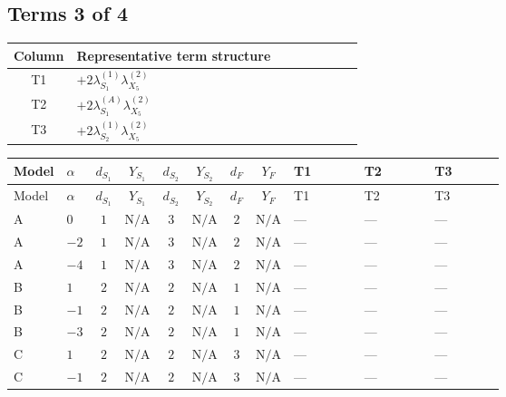 \documentclass[8pt]{article}
\begin{document}
\begin{landscape}
\subsection*{Terms 3 of 4}
\begin{center}
\begin{tabular}{@{}c >{\raggedright\arraybackslash}p{0.82\linewidth}@{}}
\toprule
Column & Representative term structure \\
\midrule
T1 & \(\displaystyle +2 {\lambda_{S_1}^{(1)}} {\lambda_{X_{5}}^{(2)}}\) \\
\midrule
T2 & \(\displaystyle +2 {\lambda_{S_1}^{(A)}} {\lambda_{X_{5}}^{(2)}}\) \\
\midrule
T3 & \(\displaystyle +2 {\lambda_{S_2}^{(1)}} {\lambda_{X_{5}}^{(2)}}\) \\
\midrule
\bottomrule
\end{tabular}
\end{center}
\smallskip
\tiny
\begin{longtable}{@{}llcccccc >{\raggedright\arraybackslash}p{0.21\linewidth} >{\raggedright\arraybackslash}p{0.21\linewidth} >{\raggedright\arraybackslash}p{0.21\linewidth}@{}}
\toprule
Model & $\alpha$ & $d_{S_1}$ & $Y_{S_1}$ & $d_{S_2}$ & $Y_{S_2}$ & $d_F$ & $Y_F$ & T1 & T2 & T3 \\
\midrule
\endfirsthead
\toprule
Model & $\alpha$ & $d_{S_1}$ & $Y_{S_1}$ & $d_{S_2}$ & $Y_{S_2}$ & $d_F$ & $Y_F$ & T1 & T2 & T3 \\
\midrule
\endhead
A & $0$ & $1$ & $\text{N/A}$ & $3$ & $\text{N/A}$ & $2$ & $\text{N/A}$ & --- & --- & --- \\
\midrule
A & $-2$ & $1$ & $\text{N/A}$ & $3$ & $\text{N/A}$ & $2$ & $\text{N/A}$ & --- & --- & --- \\
\midrule
A & $-4$ & $1$ & $\text{N/A}$ & $3$ & $\text{N/A}$ & $2$ & $\text{N/A}$ & --- & --- & --- \\
\midrule
B & $1$ & $2$ & $\text{N/A}$ & $2$ & $\text{N/A}$ & $1$ & $\text{N/A}$ & --- & --- & --- \\
\midrule
B & $-1$ & $2$ & $\text{N/A}$ & $2$ & $\text{N/A}$ & $1$ & $\text{N/A}$ & --- & --- & --- \\
\midrule
B & $-3$ & $2$ & $\text{N/A}$ & $2$ & $\text{N/A}$ & $1$ & $\text{N/A}$ & --- & --- & --- \\
\midrule
C & $1$ & $2$ & $\text{N/A}$ & $2$ & $\text{N/A}$ & $3$ & $\text{N/A}$ & --- & --- & --- \\
\midrule
C & $-1$ & $2$ & $\text{N/A}$ & $2$ & $\text{N/A}$ & $3$ & $\text{N/A}$ & --- & --- & --- \\

\end{longtable}
\end{landscape}
\end{document}
